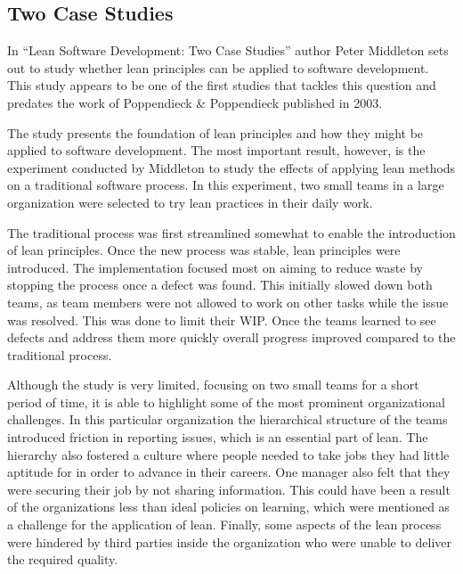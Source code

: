 \subsection{Two Case Studies}
\label{twocasestudies}

In ``Lean Software Development: Two Case Studies''\cite{Middleton2001Lean} author Peter Middleton sets out to study whether lean principles can be applied to software development. This study appears to be one of the first studies that tackles this question and predates the work of Poppendieck \& Poppendieck published in 2003.

The study presents the foundation of lean principles and how they might be applied to software development. The most important result, however, is the experiment conducted by Middleton to study the effects of applying lean methods on a traditional software process. In this experiment, two small teams in a large organization were selected to try lean practices in their daily work.\cite{Middleton2001Lean}

The traditional process was first streamlined somewhat to enable the introduction of lean principles. Once the new process was stable, lean principles were introduced. The implementation focused most on aiming to reduce waste by stopping the process once a defect was found. This initially slowed down both teams, as team members were not allowed to work on other tasks while the issue was resolved. This was done to limit their WIP. Once the teams learned to see defects and address them more quickly overall progress improved compared to the traditional process.\cite{Middleton2001Lean}

Although the study is very limited, focusing on two small teams for a short period of time, it is able to highlight some of the most prominent organizational challenges. In this particular organization the hierarchical structure of the teams introduced friction in reporting issues, which is an essential part of lean. The hierarchy also fostered a culture where people needed to take jobs they had little aptitude for in order to advance in their careers. One manager also felt that they were securing their job by not sharing information. This could have been a result of the organizations less than ideal policies on learning, which were mentioned as a challenge for the application of lean. Finally, some aspects of the lean process were hindered by third parties inside the organization who were unable to deliver the required quality.\cite{Middleton2001Lean}

